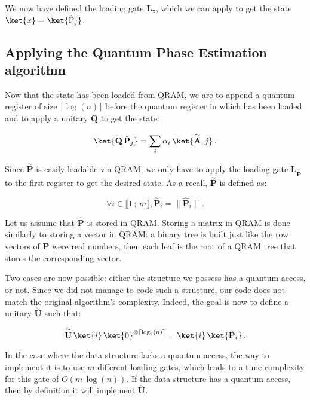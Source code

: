 \documentclass[11pt, a4paper]{article}
\begin{document}
                We now have defined the loading gate \(\mathbf{L}_\mathrm{x}\), which we can apply to get the state \(\ket{x}=\ket{\hat{\mathrm{P}}_j}\).


        \subsection{Applying the Quantum Phase Estimation algorithm}
            \label{subsec:ImplementingQPE}
            Now that the state  has been loaded from QRAM, we are to append a quantum register of size \(\lceil\log(n)\rceil\) before the quantum register in which  has been loaded and to apply a unitary \(\mathbf{Q}\) to get the state:
            
            \[\ket{\mathbf{Q}\,\hat{\mathbf{P}}_j}=\sum_i\alpha_i\,\ket{\overset{\sim}{\mathbf{A}}, j}\,.\]
            
            Since \(\overset{\sim}{\mathbf{P}}\) is easily loadable via QRAM, we only have to apply the loading gate \(\mathbf{L}_{\overset{\sim}{\mathbf{P}}}\) to the first register to get the desired state. As a recall, \(\overset{\sim}{\mathbf{P}}\) is defined as:
            
            \[\forall i\in\llbracket1\,;\,m\rrbracket,\overset{\sim}{\mathbf{P}}_i=\|\hat{\mathbf{P}}_i\|\,.\]
            
            Let us assume that \(\hat{\mathbf{P}}\) is stored in QRAM. Storing a matrix in QRAM is done similarly to storing a vector in QRAM: a binary tree is built just like the row vectors of \(\hat{\mathbf{P}}\) were real numbers, then each leaf is the root of a QRAM tree that stores the corresponding vector.
            
            Two cases are now possible: either the structure we possess has a quantum access, or not. Since we did not manage to code such a structure, our code does not match the original algorithm's complexity. Indeed, the goal is now to define a unitary \(\overset{\sim}{\mathbf{U}}\) such that:
            
            \[\overset{\sim}{\mathbf{U}}\,\ket{i}\,\ket{0}^{\otimes\left\lceil\log_2(n)\right\rceil}=\ket{i}\,\ket{\hat{\mathbf{P}}_i}\,.\]
            
            In the case where the data structure lacks a quantum access, the way to implement it is to use \(m\) different loading gates, which leads to a time complexity for this gate of \(O(m\,\log(n))\). If the data structure has a quantum access, then by definition it will implement \(\overset{\sim}{\mathbf{U}}\).
            
\end{document}
